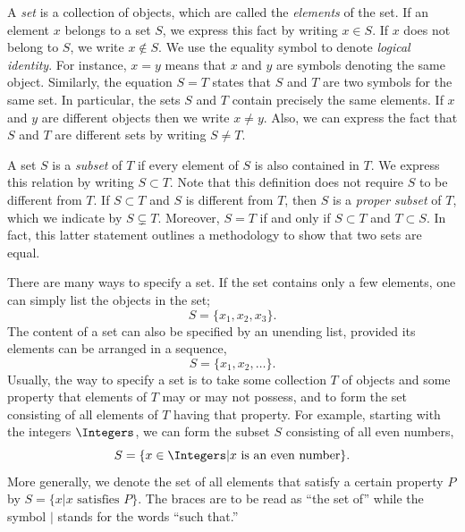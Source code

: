 A \emph{set} is a collection of objects, which are called the \emph{elements} of the set.
If an element $x$ belongs to a set $S$, we express this fact by writing $x \in S$.
If $x$ does not belong to $S$, we write $x \notin S$.
We use the equality symbol to denote \emph{logical identity}.
For instance, $x = y$ means that $x$ and $y$ are symbols denoting the same object.
Similarly, the equation $S = T$ states that $S$ and $T$ are two symbols for the same set.
In particular, the sets $S$ and $T$ contain precisely the same elements.
If $x$ and $y$ are different objects then we write $x \neq y$.
Also, we can express the fact that $S$ and $T$ are different sets by writing $S \neq T$.

A set $S$ is a \emph{subset} of $T$ if every element of $S$ is also contained in $T$.
We express this relation by writing $S \subset T$.
Note that this definition does not require $S$ to be different from $T$.
If $S \subset T$ and $S$ is different from $T$, then $S$ is a \emph{proper subset} of $T$, which we indicate by $S \subsetneq T$.
Moreover, $S = T$ if and only if $S \subset T$ and $T \subset S$.
In fact, this latter statement outlines a methodology to show that two sets are equal.

There are many ways to specify a set.
If the set contains only a few elements, one can simply list the objects in the set;
\begin{equation*}
S = \{ x_1, x_2, x_3 \} .
\end{equation*}
The content of a set can also be specified by an unending list, provided its elements can be arranged in a sequence,
\begin{equation*}
S = \{ x_1, x_2, \ldots \} .
\end{equation*}
Usually, the way to specify a set is to take some collection $T$ of objects and some property that elements of $T$ may or may not possess, and to form the set consisting of all elements of $T$ having that property.
For example, starting with the integers $\Integers$, we can form the subset $S$ consisting of all even numbers,
\begin{equation*}
S = \{ x \in \Integers | x \text{ is an even number} \}.
\end{equation*}
More generally, we denote the set of all elements that satisfy a certain property $P$ by $S = \{ x | x \text{ satisfies } P \}$.
The braces are to be read as ``the set of'' while the symbol $|$ stands for the words ``such that.''

